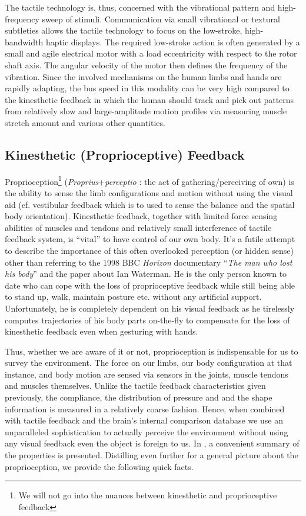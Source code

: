 The tactile technology is, thus, concerned with the vibrational pattern and high-frequency sweep of stimuli. Communication via small 
vibrational or textural subtleties allows the tactile technology to focus on the low-stroke, high-bandwidth haptic displays. The required 
low-stroke action is often generated by a small and agile electrical motor with a load eccentricity with respect to the rotor shaft axis. 
The angular velocity of the motor then defines the frequency of the vibration. Since the involved mechanisms on the human limbs and hands 
are rapidly adapting, the bus speed in this modality can be very high compared to the kinesthetic feedback in which the human should 
track and pick out patterns from relatively slow and large-amplitude motion profiles via measuring muscle stretch amount and various 
other quantities. 


\subsection{Kinesthetic (Proprioceptive) Feedback}
Proprioception\footnote{We will not go into the nuances between kinesthetic and proprioceptive feedback} (\emph{Proprius}+\emph{perceptio}
: the act of gathering/perceiving of own) is the ability to sense the limb configurations and motion without using the visual aid (cf. 
vestibular feedback which is to used to sense the balance and the spatial body orientation). Kinesthetic feedback, together with limited 
force sensing abilities of muscles and tendons and relatively small interference of tactile feedback system, is \enquote{vital} to have 
control of our own body. It's a futile attempt to describe the importance of this often overlooked perception (or hidden sense) other 
than referring to the 1998 BBC \emph{Horizon} documentary \enquote{\emph{The man who lost his body}} and the paper \cite{waterman} about 
Ian Waterman. He is the only person known to date who can cope with the loss of proprioceptive feedback while still being able to stand 
up, walk, maintain posture etc. without any artificial support. Unfortunately, he is completely dependent on his visual feedback as he 
tirelessly computes trajectories of his body parts on-the-fly to compensate for the loss of kinesthetic feedback even when gesturing with 
hands. 

Thus, whether we are aware of it or not, proprioception is indispensable for us to survey the environment. The force on our limbs, our 
body configuration at that instance, and body motion are sensed via sensors in the joints, muscle tendons and muscles themselves. Unlike 
the tactile feedback characteristics given previously, the compliance, the distribution of pressure and and the shape information is 
measured in a relatively coarse fashion. Hence, when combined with tactile feedback and the brain's internal comparison database we use 
an unparalleled sophistication to actually perceive the environment without using any visual feedback even the object is foreign to us. 
In \cite{biggssrinivasan}, a convenient summary of the properties is presented. Distilling even further for a general picture about the 
proprioception, we provide the following quick facts. 

